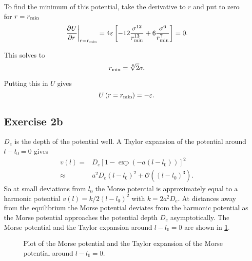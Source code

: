 \documentclass[titlepage]{report}
\begin{document}
To find the minimum of this potential, take the derivative to $ r $ and put to zero for $ r = r_{\rm{min}} $
\begin{equation}
	\left. \frac{\partial^{} {U}}{\partial {r}^{}} \right|_{r=r_{\rm{min}}} = 4 \varepsilon \left[ -12 \frac{\sigma^{12}}{r_{\rm{min}}^{13}} + 6\frac{\sigma^{6}}{r_{\rm{min}}^{7}} \right] = 0.
\end{equation}

This solves to
\begin{equation}
	r_{\rm{min}} = \sqrt[6]{2} \sigma.
\end{equation}

Putting this in $ U $ gives
\begin{equation}
	U\left(r = r_{\rm{min}}\right) = - \varepsilon.
\end{equation}

\subsection{Exercise 2b}
$ D_e $ is the depth of the potential well. 
A Taylor expansion of the potential around $ l - l_0 = 0 $ gives
\begin{subequations}
	\begin{align}
		v(l) =& D_e \left[ 1 - \exp\left(-a (l-l_0)\right) \right]^2 \\
		\approx& a^2 D_e (l-l_0)^2 + \mathcal{O}\left((l-l_0)^3\right).
	\end{align}
\end{subequations}
So at small deviations from $ l_0 $ the Morse potential is approximately equal to a harmonic potential $ v(l) = k/2 (l-l_0)^2 $ with $ k = 2 a^2 D_e $.
At distances away from the equilibrium the Morse potential deviates from the harmonic potential as the Morse potential approaches the potential depth $ D_e $ asymptotically. 
The Morse potential and the Taylor expansion around $ l - l_0 = 0 $ are shown in \cref{fig:THEX2b}.
\begin{figure}[h!]
	\centering
	
	\caption{Plot of the Morse potential and the Taylor expansion of the Morse potential around $ l-l_0 = 0 $.}
	\label{fig:THEX2b}
\end{figure}
\end{document}
